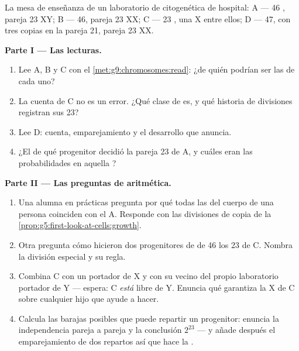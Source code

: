\begin{problem}\label{pb:g9:chromosomes:1}
La mesa de enseñanza de un laboratorio de citogenética de hospital:
 A --- 46 , pareja 23 XY; B --- 46, pareja 23 XX;
C --- 23 , una X entre ellos; D --- 47, con tres copias en la
pareja 21, pareja 23 XX.

\medskip\noindent\textbf{Parte I --- Las lecturas.}
\begin{enumerate}
  \item Lee A, B y C con el \cref{met:g9:chromosomes:read}: ¿de quién
        podrían ser las  de cada uno?
  \item La cuenta de C no es un error. ¿Qué clase de  es, y qué
        historia de divisiones registran sus 23?
  \item Lee D: cuenta, emparejamiento y el desarrollo que anuncia.
  \item ¿El  de qué progenitor decidió la pareja 23 de A, y
        cuáles eran las probabilidades en aquella ?
\end{enumerate}

\medskip\noindent\textbf{Parte II --- Las preguntas de
aritmética.}
\begin{enumerate}[resume]
  \item Una alumna en prácticas pregunta por qué todas las  del
        cuerpo de una persona coinciden con el  A. Responde
        con las divisiones de copia de la
        \cref{prop:g5:first-look-at-cells:growth}.
  \item Otra pregunta cómo hicieron dos progenitores de  de 46
        los 23 de C. Nombra la división especial y su regla.
  \item Combina C con un  portador de X y con su vecino del propio
        laboratorio portador de Y --- espera: C \emph{está} libre de Y.
        Enuncia qué garantiza la X de C sobre cualquier hijo que ayude
        a hacer.
  \item Calcula las barajas posibles que puede repartir un progenitor:
        enuncia la independencia pareja a pareja y la conclusión
        $2^{23}$ --- y añade después el emparejamiento de dos repartos
        así que hace la .
\end{enumerate}


\end{problem}
